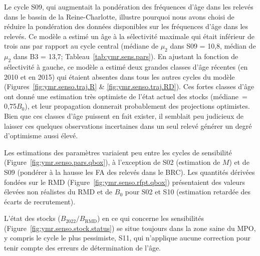 \documentclass[11pt]{book}
\newcommand{\Bmsy}{B_\text{RMD}}
\begin{document}
Le cycle S09, qui augmentait la pond\'{e}ration des fr\'{e}quences d'\^{a}ge dans les relev\'{e}s dans le bassin de la Reine-Charlotte, illustre pourquoi nous avons choisi de r\'{e}duire la pond\'{e}ration des donn\'{e}es disponibles sur les fr\'{e}quences d'\^{a}ge dans les relev\'{e}s. 
Ce mod\`{e}le a estim\'{e} un \^{a}ge \`{a} la s\'{e}lectivit\'{e} maximale qui \'{e}tait inf\'{e}rieur de trois ans par rapport au cycle central (m\'{e}diane de $\mu_2$ dans S09 = 10,8, m\'{e}dian de $\mu_2$ dans B3 = 13,7; Tableau~\ref{tab:ymr.sens.pars}).
En ajustant la fonction de s\'{e}lectivit\'{e} \`{a} gauche, ce mod\`{e}le a estim\'{e} deux grandes classes d'\^{a}ge r\'{e}centes (en 2010 et en 2015) qui \'{e}taient absentes dans tous les autres cycles du mod\`{e}le (Figures~\ref{fig:ymr.senso.traj.R} \& \ref{fig:ymr.senso.traj.RD}).
Ces fortes classes d'\^{a}ge ont donn\'{e} une estimation tr\`{e}s optimiste de l'\'{e}tat actuel des stocks (m\'{e}diane~= 0,75$B_0$), et leur propagation donnerait probablement des projections optimistes.
Bien que ces classes d'\^{a}ge puissent en fait exister, il semblait peu judicieux de laisser ces quelques observations incertaines dans un seul relev\'{e} g\'{e}n\'{e}rer un degr\'{e} d'optimisme aussi \'{e}lev\'{e}.

Les estimations des param\`{e}tres variaient peu entre les cycles de sensibilit\'{e} (Figure~\ref{fig:ymr.senso.pars.qbox}), \`{a} l'exception de S02 (estimation de $M$) et de S09 (pond\'{e}rer \`{a} la hausse les FA des relev\'{e}s dans le BRC).
Les quantit\'{e}s d\'{e}riv\'{e}es fond\'{e}es sur le RMD (Figure~\ref{fig:ymr.senso.rfpt.qbox}) pr\'{e}sentaient des valeurs \'{e}lev\'{e}es non r\'{e}alistes du RMD et de $B_0$ pour S02 et S10 (estimation retard\'{e}e des \'{e}carts de recrutement).

L'\'{e}tat des stocks ($B_{2022}/\Bmsy$) en ce qui concerne les sensibilit\'{e}s (Figure~\ref{fig:ymr.senso.stock.status}) se situe toujours dans la zone saine du MPO, y compris le cycle le plus pessimiste, S11, qui n'applique aucune correction pour tenir compte des erreurs de d\'{e}termination de l'\^{a}ge.

\begin{landscapepage}{

}{\LH}{\RH}{\LF}{\RF}\end{landscapepage}

\begin{landscapepage}{

}{\LH}{\RH}{\LF}{\RF} \end{landscapepage}
\end{document}
